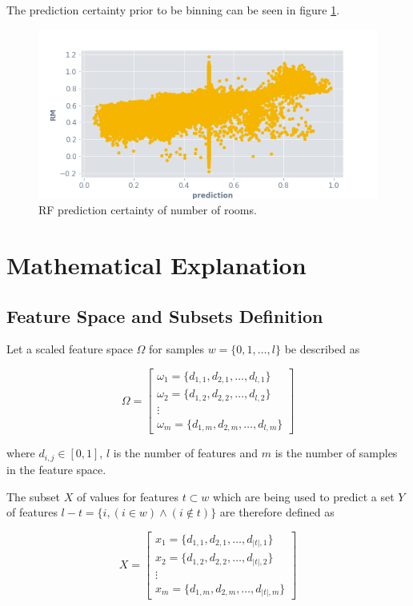 \documentclass[a4paper, twocolumn]{article}
\begin{document}
The prediction certainty prior to be binning can be seen in figure \ref{fig:reg-rf-if-rm}.

\begin{figure}
\centering
\includegraphics[width=0.7\columnwidth]{img/reg_rf_if_rm.png}
\caption{RF prediction certainty of number of rooms.}
\label{fig:reg-rf-if-rm}
\end{figure}

\section{Mathematical Explanation}

\subsection{Feature Space and Subsets Definition}

Let a scaled feature space $\Omega$ for samples $w = \{0, 1, \ldots, l\}$ be described as

$$\Omega =
\begin{bmatrix}
{\omega_1 = \{d_{1, 1}, d_{2, 1}, \ldots, d_{l, 1}\}} \\
{\omega_2 = \{d_{1, 2}, d_{2, 2}, \ldots, d_{l, 2}\}} \\
\vdots \\
{\omega_m = \{d_{1, m}, d_{2, m}, \ldots, d_{l, m}\}}
\end{bmatrix}
$$

where $d_{i, j} \in [0,1]$, $l$ is the number of features and $m$ is the number of samples in the feature space.

The subset $X$ of values for features $t \subset w$ which are being used to predict a set $Y$ of features $l - t = \{i, (i \in w) \land (i \notin t)\}$ are therefore defined as

$$X =
\begin{bmatrix}
{x_1 = \{d_{1, 1}, d_{2, 1}, \ldots, d_{|t|, 1}\}} \\
{x_2 = \{d_{1, 2}, d_{2, 2}, \ldots, d_{|t|, 2}\}} \\
\vdots \\
{x_m = \{d_{1, m}, d_{2, m}, \ldots, d_{|t|, m}\}}
\end{bmatrix}
$$
\end{document}
